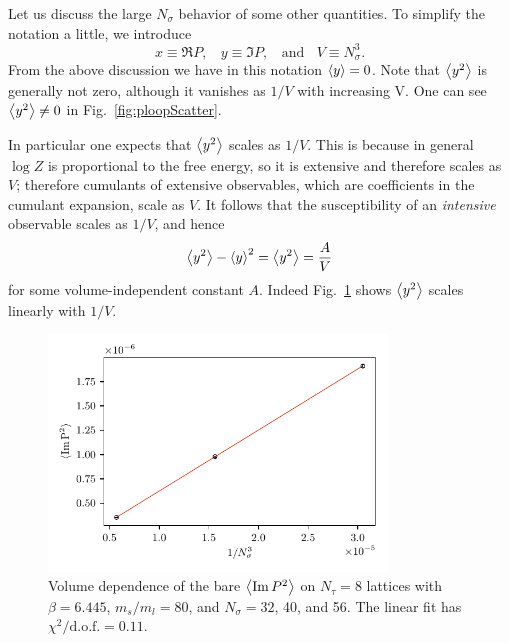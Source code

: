 Let us discuss the large $N_\sigma$ behavior of some other quantities.
To simplify the notation a little, we introduce
\begin{equation}
x\equiv \Re P,~~~~y\equiv \Im P,~~~~\text{and}~~~~V\equiv N_\sigma^3.
\end{equation}
From the above discussion we have in this notation $\ev{y}=0$.
Note that $\ev{y^2}$ is generally not zero,
although it vanishes as $1/V$ with increasing V.
One can see $\ev{y^2}\neq0$ in Fig.~\ref{fig:ploopScatter}.

In particular one expects that $\ev{y^2}$ scales as
$1/V$. This is because in general $\log Z$ is proportional
to the free energy, so it is extensive and therefore scales as $V$;
therefore cumulants of extensive observables, which are coefficients in
the cumulant expansion, scale as $V$. It follows that the
susceptibility of an {\it intensive} observable scales as $1/V$,
and hence
\begin{equation}\label{eq:fssim}
  \ev{y^2}-\ev{y}^2 =\ev{y^2}=\frac{A}{V}
\end{equation}
for some volume-independent constant $A$. Indeed Fig.~\ref{fig:ImPvol} shows 
$\ev{y^2}$ scales linearly with $1/V$.

\begin{figure}
  \centering
  \includegraphics[width=0.8\textwidth]{figs/ImP2_voldepend.pdf}
  \caption{Volume dependence of the bare $\ev{\Im P^2}$ on $N_\tau=8$
           lattices with $\beta=6.445$, $m_s/m_l=80$, and $N_\sigma=32$, 40,
           and 56. The linear fit has
           $\chi^2/\text{d.o.f.}=0.11$.}
  \label{fig:ImPvol}
\end{figure}

